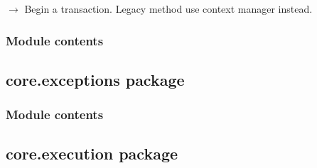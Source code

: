\documentclass[letterpaper,10pt,english]{sphinxmanual}
\begin{document}
\begin{fulllineitems}
\begin{fulllineitems}
\end{fulllineitems}


\begin{fulllineitems}
\label{\detokenize{core.database.sqlite_adapter:core.database.sqlite_adapter.SQLiteAdapter.transaction}}
\pysigstartsignatures
\pysiglinewithargsret
{}
{}
{{ $\rightarrow$ {\hyperref[\detokenize{core.database.sqlite_adapter:core.database.sqlite_adapter.SQLiteAdapter}]{}}}}
\pysigstopsignatures
\sphinxAtStartPar
Begin a transaction. Legacy method \sphinxhyphen{} use context manager instead.

\end{fulllineitems}


\end{fulllineitems}



\subsubsection{Module contents}
\label{\detokenize{core.database:module-core.database}}\label{\detokenize{core.database:module-contents}}
\sphinxstepscope


\subsection{core.exceptions package}
\label{\detokenize{core.exceptions:core-exceptions-package}}\label{\detokenize{core.exceptions::doc}}

\subsubsection{Module contents}
\label{\detokenize{core.exceptions:module-core.exceptions}}\label{\detokenize{core.exceptions:module-contents}}
\sphinxstepscope


\subsection{core.execution package}
\label{\detokenize{core.execution:core-execution-package}}\label{\detokenize{core.execution::doc}}
\end{document}
